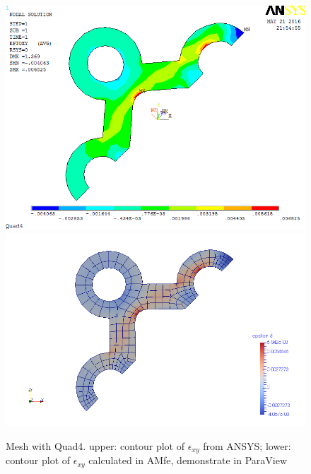 \begin{figure}[htbp]
	\begin{center}
		\includegraphics[width=13cm,clip]{Quad4_Exy.png} 		
		\includegraphics[width=13cm,clip]{Quad4_Exy_P.png} 		
		\caption{Mesh with Quad4. upper: contour plot of $\epsilon_{xy}$ from ANSYS; lower: contour plot of $\epsilon_{xy}$ calculated in AMfe, demonstrate in ParaView} \label{fig: Quad4_Exy}
	\end{center}
\end{figure}
\clearpage 

